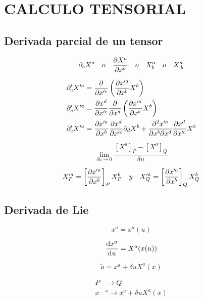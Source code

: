 \documentclass[../main]{subfiles}
\begin{document}
\chapter{CALCULO TENSORIAL}

\section{Derivada parcial de un tensor}

\begin{equation*}
    \partial_b X^a \quad o \quad \pdv{X^a}{x^b} \quad o \quad X^a_b \quad o \quad X^a_{|b}
\end{equation*}

\begin{align}
    \partial'_c X'^a&= \pdv{}{x'^c} \left( \pdv{x'^a}{x^b}X^b \right) \nonumber \\
    \partial'_c X'^a&= \pdv{x^d}{x'^c} \pdv{}{x^d} \left( \pdv{x'^a}{x^b} X^b \right) \nonumber \\
    \partial'_c X'^a&= \pdv{x'^a}{x^b} \pdv{x^d}{x'^c} \partial_d X^b + \pdv{^2 x'^a}{x^b \partial x^d} \pdv{x^d}{x'^c}X^b 
\end{align}

\begin{equation*}
    \lim_{\delta u \rightarrow 0} \dfrac{[X^a]_P-[X^a]_Q}{\delta u}
\end{equation*}

\begin{equation*}
    X'^a_P=\left[ \pdv{x'^a}{x^b} \right]_P X^b_P \quad y \quad X'^a_Q=\left[ \pdv{x'^a}{x^b} \right]_Q X^b_Q
\end{equation*}

\section{Derivada de Lie}

\begin{equation*}
    x^a=x^a(u)
\end{equation*}

\begin{equation}
    \dv{x^a}{u}=X^a(x(u))
\end{equation}

\begin{equation}
    \tilde{a}=x^a+\delta u X^a(x)
\end{equation}

\begin{align*}
    P& \rightarrow Q \\
    x&^a \rightarrow x^a+\delta u X^a(x)
\end{align*}
\end{document}
